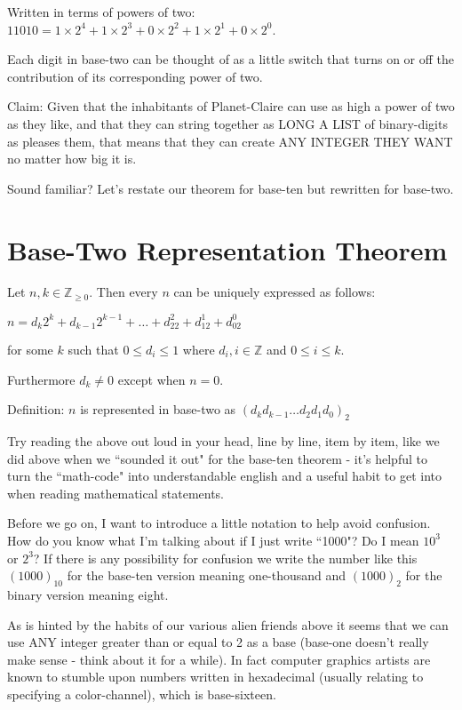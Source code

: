 \documentclass{article}
\newenvironment{jprIn1}{\begin{adjustwidth}{3em}{}}{\end{adjustwidth}}
\begin{document}
Written in terms of powers of two: $11010=1\times2^4+1\times2^3+0\times2^2+1\times2^1+0\times2^0$.

Each digit in base-two can be thought of as a little switch that
turns on or off the contribution of its corresponding power of two.

Claim: Given that the inhabitants of Planet-Claire can use as high a power of two as they like,
and that they can string together as LONG A LIST of binary-digits as pleases them,
that means that they can create ANY INTEGER THEY WANT no matter how big it is.

Sound familiar? Let's restate our theorem for base-ten but rewritten for base-two.

\section*{Base-Two Representation Theorem}

\begin{jprIn1}
Let $n,k\in \mathbb{Z}_{\ge 0}$. Then every $n$ can be uniquely expressed as follows:

\hspace{3em}$n=d_k2^k+d_{k-1}2^{k-1}+\dots+d_22^2+d_12^1+d_02^0$

for some $k$ such that $0 \le d_i \le 1$ where $d_i,i\in\mathbb{Z}$ and $0 \le i \le k$.

Furthermore $d_k\ne0$ except when $n=0$.

Definition: $n$ is represented in base-two as $(d_kd_{k-1}\dots{}d_2d_1d_0)_2$
\end{jprIn1}
\bigskip

Try reading the above out loud in your head,
line by line, item by item, like we did above when
we ``sounded it out" for the base-ten theorem - it's
helpful to turn the ``math-code" into understandable
english and a useful habit to get into when reading mathematical statements.

Before we go on,
I want to introduce a little notation to help avoid confusion.
How do you know what I'm talking about if I just
write ``1000"? Do I mean $10^3$ or $2^3$?
If there is any possibility for confusion we write
the number like this $(1000)_{10}$ 
for the base-ten version meaning one-thousand and $(1000)_2$
for the binary version meaning eight.

As is hinted by the habits of our various alien friends
above it seems that we can use ANY integer greater than
or equal to 2 as a base (base-one doesn't really make
sense - think about it for a while).
In fact computer graphics artists are known
to stumble upon numbers written in hexadecimal (usually relating to specifying a color-channel),
which is base-sixteen.
\end{document}
